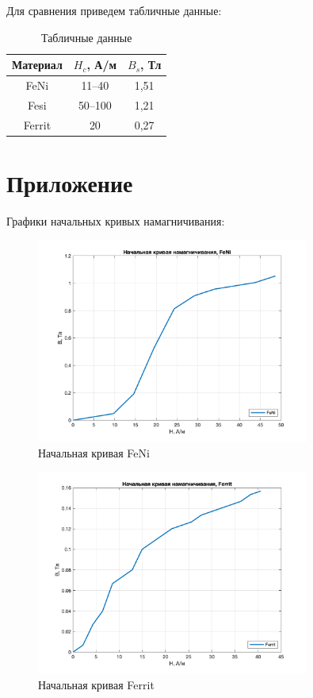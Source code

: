\documentclass[a4paper, 12pt]{article}
\begin{document}
Для сравнения приведем табличные данные:

\begin{table}[H]
	\centering
	\begin{tabular}{|c|c|c|}
		\hline
		Материал     & $H_c$, А/м & $B_s$, Тл \\ \hline
		FeNi         & 11--40     & 1,51      \\ \hline
		Fesi         & 50--100    & 1,21      \\ \hline
		Ferrit       & 20         & 0,27      \\ \hline
	\end{tabular}
	\caption{Табличные данные}
	\label{tab:tablica}
\end{table}

\section{Приложение}

Графики начальных кривых намагничивания:

\begin{figure}[h]
    \centering
    \includegraphics[width=0.8\textwidth]{FeNi}
    \caption{Начальная кривая FeNi}
    \label{fig:FeNi}
\end{figure}

\begin{figure}[h]
    \centering
    \includegraphics[width=0.8\textwidth]{Ferrit}
    \caption{Начальная кривая Ferrit}
    \label{fig:Ferrit}
\end{figure}
\end{document}
